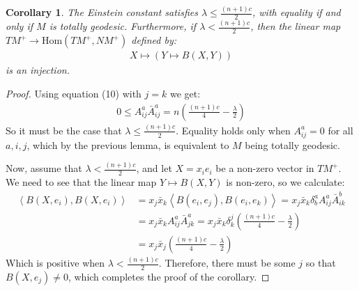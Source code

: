 \documentclass[11pt]{amsart}
\newtheorem{cor}[subsection]{Corollary}
\def \la { \left\langle }
\def \ra { \right\rangle }
\def \Hom{ \text{Hom} }
\def \TMp{ TM^{+} }
\def \NMp{ NM^+ }
\theoremstyle{definition}
\begin{document}
\begin{cor}  The Einstein constant satisfies $\lambda \leq \frac{(n+1)c}{2}$, with equality if and only if $M$ is totally geodesic.  Furthermore, if $\lambda < \frac{(n+1)c}{2}$, then the linear map $\TMp \rightarrow \Hom ( \TMp, \NMp )$ defined by:
%
\begin{align*}
X \mapsto ( Y \mapsto B(X, Y) )
\end{align*}
%
is an injection.
%
\end{cor}

\begin{proof} Using equation (10) with $j=k$ we get:
%
\begin{align*}
0 \leq A^a_{ij} \bar{A}^a_{ij} = n \left( \frac{(n+1)c}{4} - \frac{\lambda}{2} \right)
\end{align*}
%
So it must be the case that $\lambda \leq \frac{(n+1)c}{2}$.  Equality holds only when $A^a_{ij} = 0$ for all $a,i,j$, which by the previous lemma, is equivalent to $M$ being totally geodesic.

Now, assume that $\lambda < \frac{(n+1)c}{2}$, and let $X = x_i e_i$ be a non-zero vector in $\TMp$.  We need to see that the linear map $Y \mapsto B(X,Y)$ is non-zero, so we calculate:
%
\begin{align*}
\la B(X, e_i), B(X, e_i) \ra &= x_j \bar{x}_k \la B(e_i, e_j), B(e_i, e_k) \ra = x_j \bar{x}_k \delta^a_b A^a_{ij} \bar{A}^b_{ik} \\
&= x_j \bar{x}_k A^a_{ij} \bar{A}^a_{jk} = x_j \bar{x}_k \delta^j_k \left( \frac{(n+1)c}{4} - \frac{\lambda}{2} \right) \\
&= x_j \bar{x}_j \left( \frac{(n+1)c}{4} - \frac{\lambda}{2} \right)
\end{align*}
%
Which is positive when $\lambda < \frac{(n+1)c}{2}$.  Therefore, there must be some $j$ so that $B(X,e_j) \neq 0$, which completes the proof of the corollary.
%
\end{proof}
\end{document}
